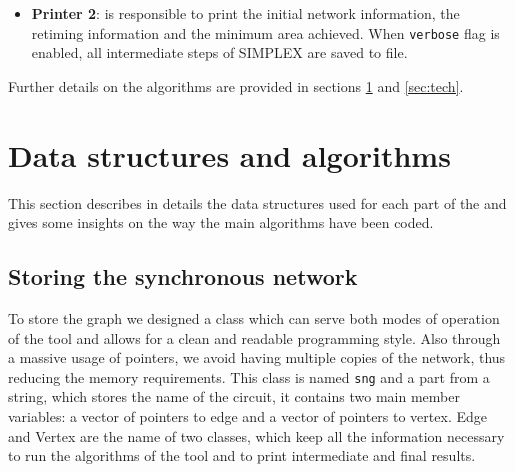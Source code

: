 \documentclass{acm_proc_article-sp}
\begin{document}
\begin{itemize}
\begin{enumerate}
      \item {\bf SIMPLEX}: given the information found in the previous step, the
        retiming problem is expressed as a set of linear disequations and a
        function to minimize, which is the total number of registers after
        retiming. The disequations are the constraints to which the network is
        subject to: there must be no combinational loops and the final circuit
        has to meet the target clock cycle.
        SIMPLEX class includes, among the others, the following important methods:
        \begin {itemize}
          \item {\bf Make Tableau}: transforms the constraints and the objective
            function into a matrix.
          \item {\bf Phase 1}: performs rows operation to get a feasible solution
            to the linear system.
          \item {\bf Phase 2}: searches for the legal and feasible retiming vector
            that minimizes the registers count. This is done again by performing
            row operations on the matrix or \texttt{tableau}.
        \end{itemize}
    \end{enumerate}
  \item {\bf Printer 2}: is responsible to print the initial network information,
    the retiming information and the minimum area achieved. When \texttt{verbose}
    flag is enabled, all intermediate steps of SIMPLEX are saved to file.
\end{itemize}

Further details on the algorithms are provided in sections \ref{sec:struct} and
\ref{sec:tech}.


\section{Data structures and algorithms}
\label{sec:struct}

This section describes in details the data structures used for each part of the
and gives some insights on the way the main algorithms have been coded.

\subsection{Storing the synchronous network}

To store the graph we designed a class which can serve both modes of operation
of the tool and allows for a clean and readable programming style. Also through
a massive usage of pointers, we avoid having multiple copies of the network,
thus reducing the memory requirements.
This class is named \texttt{sng} and a part from a string, which stores the name
of the circuit, it contains two main member variables: a vector of pointers to
edge and a vector of pointers to vertex. Edge and Vertex are the name of two
classes, which keep all the information necessary to run the algorithms of the
tool and to print intermediate and final results.
\end{document}
